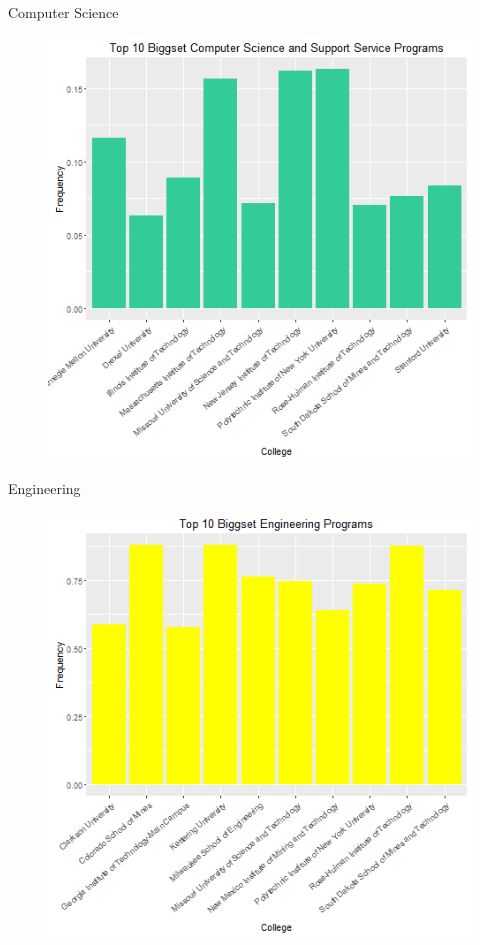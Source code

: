 \documentclass{article}
\begin{document}
Computer Science
\begin{figure}[h!]
\includegraphics{../images/biggestCS.png}
\end{figure}


Engineering
\begin{figure}[h!]
\includegraphics{../images/biggestEngineering.png}
\end{figure}
\end{document}
